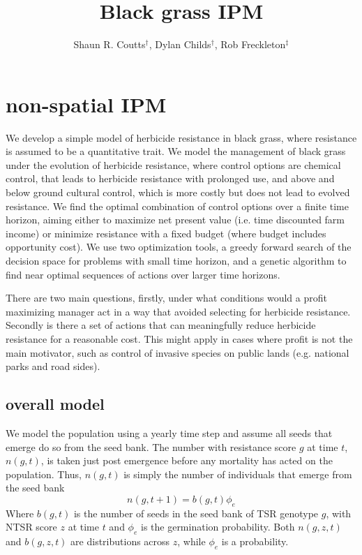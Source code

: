 \documentclass[12pt, a4paper]{article}
\begin{document}
\title{Black grass IPM}
\author{Shaun R. Coutts$^\dag$, Dylan Childs$^\dag$, Rob Freckleton$^\ddag$}
\maketitle
\section{non-spatial IPM}
We develop a simple model of herbicide resistance in black grass, where resistance is assumed to be a quantitative trait. We model the management of black grass under the evolution of herbicide resistance, where control options are chemical control, that leads to herbicide resistance with prolonged use, and above and below ground cultural control, which is more costly but does not lead to evolved resistance. We find the optimal combination of control options over a finite time horizon, aiming either to maximize net present value (i.e. time discounted farm income) or minimize resistance with a fixed budget (where budget includes opportunity cost). We use two optimization tools, a greedy forward search of the decision space for problems with small time horizon, and a genetic algorithm to find near optimal sequences of actions over larger time horizons.

There are two main questions, firstly, under what conditions would a profit maximizing manager act in a way that avoided selecting for herbicide resistance. Secondly is there a set of actions that can meaningfully reduce herbicide resistance for a reasonable cost. This might apply in cases where profit is not the main motivator, such as control of invasive species on public lands (e.g. national parks and road sides).                  

\subsection{overall model}
We model the population using a yearly time step and assume all seeds that emerge do so from the seed bank. The number with resistance score $g$ at time $t$, $n(g, t)$, is taken just post emergence before any mortality has acted on the population. Thus, $n(g, t)$ is simply the number of individuals that emerge from the seed bank    
\begin{equation}\label{eq:estab}
	n(g, t + 1) = b(g, t)\phi_e
\end{equation} 
Where $b(g, t)$ is the number of seeds in the seed bank of TSR genotype $g$, with NTSR score $z$ at time $t$ and $\phi_e$ is the germination probability. Both $n(g, z, t)$ and $b(g, z, t)$ are distributions across $z$, while $\phi_e$ is a probability.  
\end{document}
